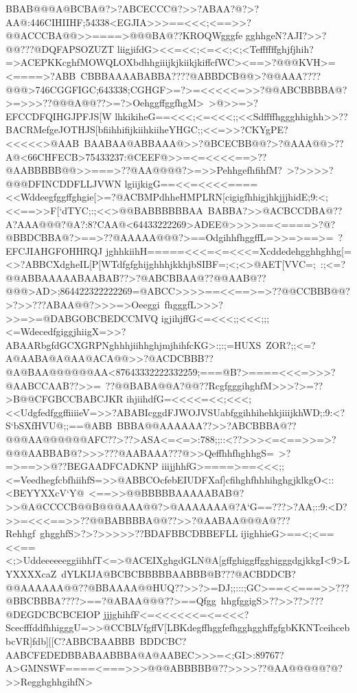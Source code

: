 {{{ BBAB@@@A@BCBA@?>?ABCECCC@?>>?ABAA?@?>?AA@:446CIHIIHF;54338<EGJIA>>>==<<<;<==>>?@@ACCCBA@@>>====>@@@BA@??KROQWgggfe%
 gghhgeN?AJI?>>?@@???@DQFAPSOZUZT}
 \hbox{liigjifdG><<=<<;<=<<;<;<Teffffffghjfjhih?=>ACEPKKcghfMOWQLOXbdhhgiiijkjkiikjkiffcfWC><==>?@@@KVH>=<====>?ABB%
 CBBBAAAABABBA????@ABBDCB@@>?@@AAA????@@@>746CGGFIGC;643338;CGHGF>=?>=<<<<<=>>?@@ABCBBBBA@?>=>>>??@@@A@@??>=?>OehggffggfhgM>%
 >@>>=>?EFCCDFQIHGJPFJS[W}
 \hbox{lhkikiheG==<<<;<=<<<;;<<Sdffffhggghhighh>>??BACRMefgeJOTHJS[bfiihhifijkiihkiiheYHGC;;<<=>>?CKYgPE?<<<<<>@AAB%
 BAABAA@ABBAAA@>>?@BCECBB@@?>?@AAA@@>??A@<66CHFECB>75433237:@CEEF@>>=<=<<<<==>??@AABBBBB@@>>===>??@AA@@@@?>=>>PehhgefhfihfM?%
 >?>>>>?@@@DFINCDDFLLJVWN}
 \hbox{lgiijkigG==<<=<<<<====<<Wddeegfggffghgie[>=?@ACBMPdhheHMPLRN[cigigfhhigjhkjjjhidE;9:<;<<==>>F[`dTYC;:;<<>@@BABBBBBBAA%
 BABBA?>>@ACBCCDBA@??A?AAA@@@?@A?:8?CAA@<64433222269>ADEE@>>>>==<====>?@?@BBDCBBA@?>==>??@AAAAA@@@?>==OdgihhfhggffL=>>=>==>=%
 ?EFCJIAHGFOHHRQJ}
 \hbox{jghhkiihH=====<<<=<=<<<=Xcddedehgghhghhg[=<>?ABBCXdgheIL[P[WTdfgfghijghhhjkkhjbSIBF=;<;<>@AET[VVC=;%
 :;<=?@@ABBAAAAABAABAB??>?@ABCBBAA@??@@AAB@??@@@>AD>;864422322222269=@ABCC>>>>==<<==>=>??@@CCBBB@@?>?>>???ABAA@@?>>>=>Oeeggi%
 fhgggfL>>>?>>=>=@DABGOBCBEDCCMVQ}
 \hbox{igjihjffG<=<<<;;<<<;;;<=WdecedfgiggjhiigX=>>?ABAARbgfdGCXGRPNghhhjiihhghjmjhihfcKG>:;:;=HUXS%
 ZOR?;;<=?A@AABA@A@AA@ACA@@>>?@ACDCBBB??@A@BAA@@@@@@AA<87643332222332259;===@B?>====<<<=>>>?@AABCCAAB??>>=%
 ??@@BABA@@A?@@??RcgfgggihghfM>>>?>=??>B@@CFGBCCBABCJKR}
 \hbox{ihjiihdfG=<<<<=<<;<<<;<<UdgfedfggffiiiieV=>>?ABABIcggdFJWOJVSUabfggihhihehkjiiijkhWD;:9:<?S`bSXfHVU@;;==@ABB%
 BBBA@@AAAAAA??>>?ABCBBBA@??@@@AA@@@@@@AFC??>??>ASA<=<=>:788;;::<??>>><=<==>>=>?@@@AABBAB@?>>>???@AABAAA???@>>QeffhhfhghhgS=%
 >?=>==>>@??BEGAADFCADKNP}
 \hbox{iiijjhhfG>====>==<<<;;<=VeedhegfcbfhiihfS=>>@ABBCOcfebEIUDFXaf]cfihghfhhhihghgjklkgO<::<BEYYXXcV`Y@%
 <==>>@@BBBBBAAAAABAB@?>>@A@CCCCB@@B@@@AAA@@?>@AAAAAAA@?A`G==???>?AA;::9:<D?>>=<<<==>>??@@BABBBBA@@??>>?@AABAA@@@A@???Rehhgf%
 ghgghfS>?>?>>>>>??BDAFBBCDBBEFLL}
 \hbox{ijighhieG>==<;<==<<==<;>UddeeeeeeggiihhfT<=>@ACEIXghgdGLN@A[gffghiggffgghigggdgjkkgI<9>LYXXXXcaZ%
 dYLKIJA@BCBCBBBBBAABBB@B???@ACBDDCB?@@AAAAAA@@??@BBAAAA@@HUQ??>>?>=DJ;;:::;GC>==<<===>>???@BBCBBBA????>==?@ABAA@@@??>==Qfgg%
 hhgfggigS>??>>??>???@DEGDCBCBCEIOP}
 \hbox{jjjghihfF<=<<<<<<=<=<<<?ScecfffddfhhigggU=>>@CCBLVfgffV[LBKdegffhggfefhgghgghffgfgbKKNTceihcebbcVR]fdb][[C?ABBCBAABBB%
 BDDCBC?AABCFEDEDBBABAABBBA@A@AABEC>>>=<;GI>:89767?A>GMNSWF====<===>>>@@@ABBBBB@??>>>>??@AA@@@@@?@?>>RegghghhgihfN>%
}}}
